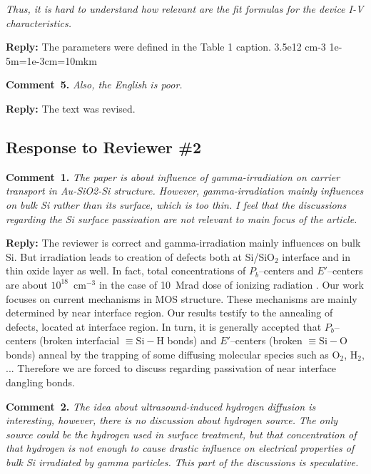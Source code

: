\documentclass[aip,jap,preprint]{revtex4-1}
\begin{document}
\emph{Thus, it is hard to understand how relevant are the fit formulas for the device I-V characteristics.}


\noindent
\textcolor[rgb]{0.51,0.00,0.00}{\textbf{Reply:}}
The parameters were defined in the Table 1 caption.
3.5e12 cm-3
1e-5m=1e-3cm=10mkm



\noindent
\textcolor[rgb]{0.00,0.50,1.00}{\textbf{Comment~5.}}
\emph{Also, the English is poor.}


\noindent
\textcolor[rgb]{0.51,0.00,0.00}{\textbf{Reply:}}
The text was revised.


\subsection*{Response to Reviewer \#2 }

\noindent
\textcolor[rgb]{0.00,0.50,1.00}{\textbf{Comment~1.}}
\emph{ The paper is about influence of gamma-irradiation on carrier transport in Au-SiO2-Si structure. However, gamma-irradiation mainly influences on bulk Si rather than its surface, which is too thin. I feel that the discussions regarding the Si surface passivation are not relevant to main focus of the article.}

\noindent
\textcolor[rgb]{0.51,0.00,0.00}{\textbf{Reply:}}
The reviewer is correct and gamma-irradiation mainly influences on bulk Si.
But irradiation leads to creation of defects both at Si/SiO$_2$  interface and in thin oxide layer as well.
In fact, total concentrations of $P_b$--centers and $E'$--centers are about $10^{18}$~cm$^{-3}$
in the case of 10~Mrad dose of ionizing radiation \cite{Fleetwood,PersenkovBook}.
Our work focuses on current mechanisms in MOS structure.
These mechanisms are mainly determined by near interface region.
Our results testify to the annealing  of defects, located at interface region.
In turn, it  is generally accepted \cite{SiO2:Devine,SiO2:Mahapatra} that $P_b$--centers (broken interfacial $\equiv\!\mathrm{Si}\!-\!\mathrm{H}$ bonds) and $E'$--centers (broken $\equiv\!\mathrm{Si}\!-\!\mathrm{O}$ bonds) anneal by  the
trapping  of  some  diffusing molecular species  such as  $\text{O}_2$, $\text{H}_2$, ...
Therefore we are forced to discuss regarding passivation of near interface dangling bonds.




\noindent
\textcolor[rgb]{0.00,0.50,1.00}{\textbf{Comment~2.}}
\emph{ The idea about ultrasound-induced hydrogen diffusion is interesting, however, there is no discussion about hydrogen source. The only source could be the hydrogen used in surface treatment, but that concentration of that hydrogen is not enough to cause drastic influence on electrical properties of bulk Si irradiated by gamma particles. This part of the discussions is speculative.}
\end{document}
